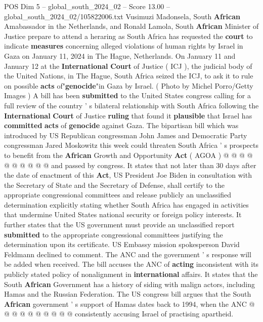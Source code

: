 \begin{textsample}{POS Dim 5 – global\_south\_2024\_02 – Score 13.00 – global\_south\_2024\_02/105822006.txt}  \label{ex:f5_pos_195}
Vusimuzi Madonsela, South \textbf{African} Amabassador in the Netherlands, and Ronald Lamola, South \textbf{African} Minister of Justice prepare to attend a heraring as South Africa has requested the \textbf{court} to indicate \textbf{measures} concerning alleged violations of human rights by Israel in Gaza on January 11, 2024 in The Hague, Netherlands.
On January 11 and January 12 at the \textbf{International} \textbf{Court} of Justice ( ICJ ), the judicial body of the United Nations, in The Hague, South Africa seized the ICJ, to ask it to rule on possible \textbf{acts} of"\textbf{genocide}"in Gaza by Israel. ( Photo by Michel Porro/Getty Images ) A bill has been \textbf{submitted} to the United States congress calling for a full review of the country ' s bilateral relationship with South Africa following the \textbf{International} \textbf{Court} of Justice \textbf{ruling} that found it \textbf{plausible} that Israel has \textbf{committed} \textbf{acts} of \textbf{genocide} against Gaza.
The bipartisan bill which was introduced by US Republican congressman John James and Democratic Party congressman Jared Moskowitz this week could threaten South Africa ' s prospects to benefit from the \textbf{African} Growth and Opportunity \textbf{Act} ( AGOA ) @ @ @ @ @ @ @ @ @ @ and passed by congress.
It states that not later than 30 days after the date of enactment of this \textbf{Act}, US President Joe Biden in consultation with the Secretary of State and the Secretary of Defense, shall certify to the appropriate congressional committees and release publicly an unclassified determination explicitly stating whether South Africa has engaged in activities that undermine United States national security or foreign policy interests.
It further states that the US government must provide an unclassified report \textbf{submitted} to the appropriate congressional committees justifying the determination upon its certificate.
US Embassy mission spokesperson David Feldmann declined to comment.
The ANC and the government ' s response will be added when received.
The bill accuses the ANC of \textbf{acting} inconsistent with its publicly stated policy of nonalignment in \textbf{international} affairs.
It states that the South \textbf{African} Government has a history of siding with malign actors, including Hamas and the Russian Federation.
The US congress bill argues that the South \textbf{African} government ' s support of Hamas dates back to 1994, when the ANC @ @ @ @ @ @ @ @ @ @ consistently accusing Israel of practising apartheid.

\end{textsample}
